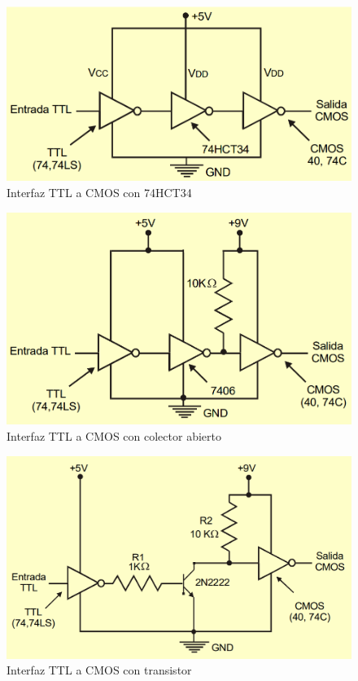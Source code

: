 \documentclass[journal]{IEEEtran}
\begin{document}
	\begin{figure}[!htb]
		\centering
		\includegraphics[scale = 0.25]{img/TTLCMOS74HC.png}
		\caption{Interfaz TTL a CMOS con 74HCT34 \cite{Ladelex}}
		\label{fig:TTLCMO74HC}
	\end{figure}
	
	\begin{figure}[!htb]
		\centering
		\includegraphics[scale = 0.25]{img/TTLCMOSColAb.png}
		\caption{Interfaz TTL a CMOS con colector abierto \cite{Ladelex}}
		\label{fig:TTLCMOSColAb}
	\end{figure}
	
	\begin{figure}[!htb]
		\centering
		\includegraphics[scale = 0.25]{img/TTLCMOSTrans.png}
		\caption{Interfaz TTL a CMOS con transistor \cite{Ladelex}}
		\label{fig:TTLCMOSTrans}
	\end{figure}
	
\end{document}
